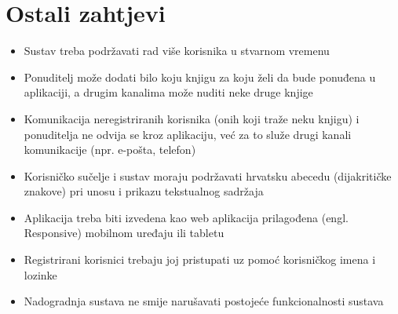 \section{Ostali zahtjevi}
\begin{itemize}
	\item Sustav treba podržavati rad više korisnika u stvarnom vremenu
	\item Ponuditelj može dodati bilo koju knjigu za koju želi da bude ponuđena u aplikaciji, a drugim kanalima može nuditi neke druge knjige
	\item Komunikacija neregistriranih korisnika (onih koji traže neku knjigu) i ponuditelja ne odvija se kroz aplikaciju, već za to služe drugi kanali komunikacije (npr. e-pošta, telefon)
	\item Korisničko sučelje i sustav moraju podržavati hrvatsku abecedu (dijakritičke znakove) pri unosu i prikazu tekstualnog sadržaja
	\item Aplikacija treba biti izvedena kao web aplikacija prilagođena (engl. Responsive) mobilnom uređaju ili tabletu
	\item Registrirani korisnici trebaju joj pristupati uz pomoć korisničkog imena i lozinke
	\item Nadogradnja sustava ne smije narušavati postojeće funkcionalnosti sustava
\end{itemize}
